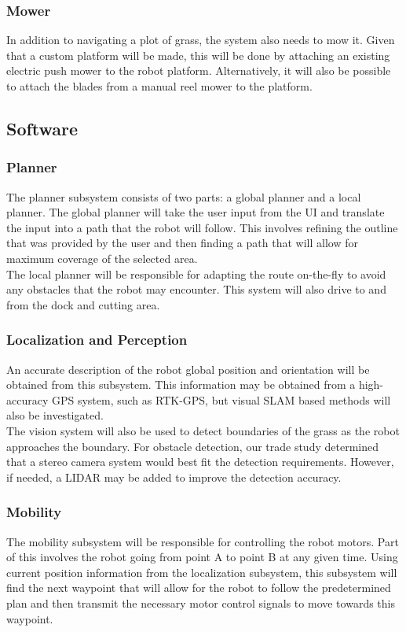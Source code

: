 \documentclass[12pt]{extarticle}
\begin{document}
    \subsubsection{Mower}
      In addition to navigating a plot of grass, the system also needs to mow it. Given that a custom platform will be made, this will be done by attaching an existing electric push mower to the robot platform. Alternatively, it will also be possible to attach the blades from a manual reel mower to the platform. 
  
  \subsection{Software}
    \subsubsection{Planner}
      The planner subsystem consists of two parts: a global planner and a local planner. The global planner will take the user input from the UI and translate the input into a path that the robot will follow. This involves refining the outline that was provided by the user and then finding a path that will allow for maximum coverage of the selected area. \\ 
      
      The local planner will be responsible for adapting the route on-the-fly to avoid any obstacles that the robot may encounter. This system will also drive to and from the dock and cutting area. 
      
    \subsubsection{Localization and Perception}
      An accurate description of the robot global position and orientation will be obtained from this subsystem. This information may be obtained from a high-accuracy GPS system, such as RTK-GPS, but visual SLAM based methods will also be investigated. \\
      
      The vision system will also be used to detect boundaries of the grass as the robot approaches the boundary. For obstacle detection, our trade study determined that a stereo camera system would best fit the detection requirements. However, if needed, a LIDAR may be added to improve the detection accuracy. 
    
    \subsubsection{Mobility}
      The mobility subsystem will be responsible for controlling the robot motors. Part of this involves the robot going from point A to point B at any given time. Using current position information from the localization subsystem, this subsystem will find the next waypoint that will allow for the robot to follow the predetermined plan and then transmit the necessary motor control signals to move towards this waypoint. \\
      
\end{document}
